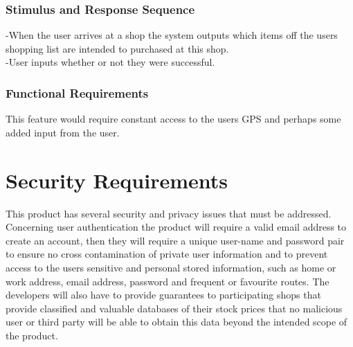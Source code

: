 \documentclass[12pt]{article}
\begin{document}
 \subsubsection{Stimulus and Response Sequence}
-When the user arrives at a shop the system outputs which items off  the users shopping list are intended to purchased at this shop.\\
-User  inputs whether or not they were successful.
 \subsubsection{Functional Requirements}
 This feature would require constant access to the users GPS and perhaps some added input from the user.
 
 \section{Security Requirements}
 This product has several security and privacy issues that must be addressed. Concerning user authentication the product will require a valid email address to create an account, then they will require a unique user-name and password pair to ensure no cross contamination of private user information and to prevent access to the users sensitive and personal stored information, such as home or work address, email address, password and frequent or favourite routes. The developers will also have to provide guarantees to participating shops that provide classified and valuable databases of their stock prices that no malicious user or third party will be able to obtain this data beyond the intended scope of the product.  
 
 
\end{document}
